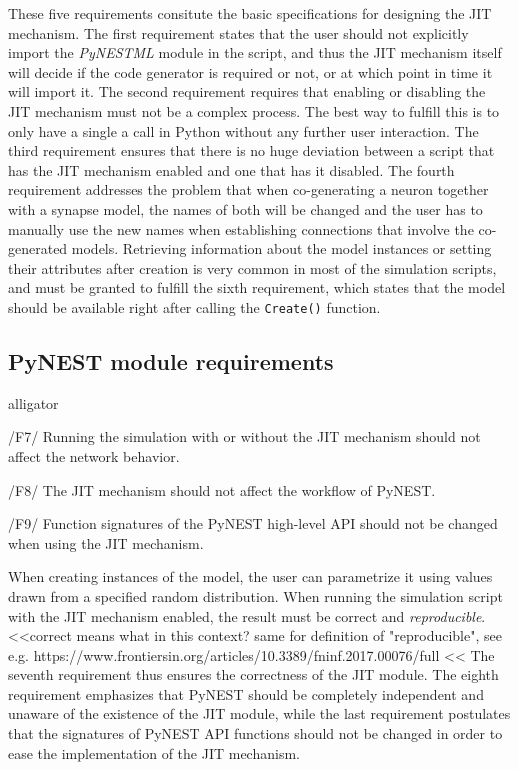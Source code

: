 These five requirements consitute the basic specifications for designing the JIT mechanism. The first requirement states that the user should not explicitly import the \emph{PyNESTML} module in the script, and thus the JIT mechanism itself will decide if the code generator is required or not, or at which point in time it will import it. The second requirement requires that enabling or disabling the JIT mechanism must not be a complex process. The best way to fulfill this is to only have a single a call in Python without any further user interaction. The third requirement ensures that there is no huge deviation between a script that has the JIT mechanism enabled and one that has it disabled. The fourth requirement addresses the problem that when co-generating a neuron together with a synapse model, the names of both will be changed and the user has to manually use the new names when establishing connections that involve the co-generated models. Retrieving information about the model instances or setting their attributes after creation is very common in most of the simulation scripts, and must be granted to fulfill the sixth requirement, which states that the model should be available right after calling the \texttt{Create()} function.

\subsection*{PyNEST module requirements}

\begin{labeling}{alligator}
   \item[/F7/] Running the simulation with or without the JIT mechanism should not affect the network behavior.
   \item[/F8/] The JIT mechanism should not affect the workflow of PyNEST.
   \item[/F9/] Function signatures of the PyNEST high-level API should not be changed when using the JIT mechanism.
\end{labeling}

When creating instances of the model, the user can parametrize it using values drawn from a specified random distribution. When running the simulation script with the JIT mechanism enabled, the result must be correct and \emph{reproducible}. <<correct means what in this context? same for definition of "reproducible", see e.g. https://www.frontiersin.org/articles/10.3389/fninf.2017.00076/full <<  The seventh requirement thus ensures the correctness of the JIT module. The eighth requirement emphasizes that PyNEST should be completely independent and unaware of the existence of the JIT module, while the last requirement postulates that the signatures of PyNEST API functions should not be changed in order to ease the implementation of the JIT mechanism.


